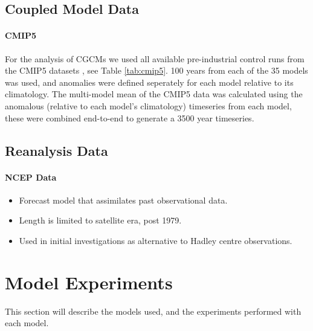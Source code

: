 
\subsection{Coupled Model Data}

\paragraph{CMIP5}
For the analysis of CGCMs we used all available pre-industrial control runs from 
the CMIP5 datasets \citep{Taylor2012}, see Table \ref{tab:cmip5}. 100 years from 
each of the 35 models was used, and anomalies were defined seperately for each 
model relative to its climatology. The multi-model mean of the CMIP5 data was 
calculated using the anomalous (relative to each model’s climatology) timeseries 
from each model, these were combined end-to-end to generate a 3500 year 
timeseries. 



\subsection{Reanalysis Data}

\paragraph{NCEP Data}
\begin{itemize}
	\item Forecast model that assimilates past observational data.
	\item Length is limited to satellite era, post 1979.
	\item Used in initial investigations as alternative to Hadley centre 
		observations.
\end{itemize}


\section{Model Experiments}

This section will describe the models used, and the experiments performed with 
each model.

